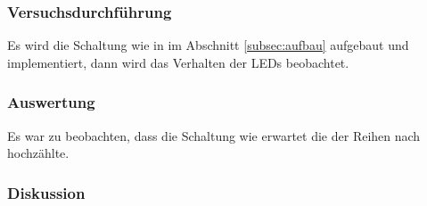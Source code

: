 \documentclass[12pt,a4paper]{article}
\begin{document}
\subsubsection*{Versuchsdurchführung}

Es wird die Schaltung wie in im Abschnitt \ref{subsec:aufbau} aufgebaut und implementiert, dann wird das Verhalten der LEDs beobachtet.

\subsubsection*{Auswertung}

Es war zu beobachten, dass die Schaltung wie erwartet die der Reihen nach hochzählte.

\subsubsection*{Diskussion}
\end{document}

